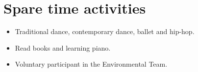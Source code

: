 \documentclass[letterpaper]{engineer_cv} %
\begin{document}
	\section{Spare time activities}

	\begin{longList} %
		\longListItem
			{}
			{}
			{}
			{\begin{itemize}
			  \item Traditional dance, contemporary dance, ballet and hip-hop.
			  \item Read books and learning piano.
              \item Voluntary participant in the Environmental Team.
			\end{itemize}}
			{}
			{}
			\\
	\end{longList}

	\raggedleft{\today}
\end{document}
